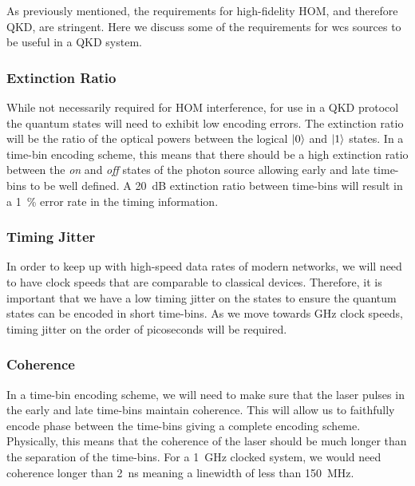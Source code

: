 As previously mentioned, the requirements for high-fidelity \ac{HOM}, and therefore \ac{QKD}, are stringent. Here we discuss some of the requirements for \ac{wcs} sources to be useful in a \ac{QKD} system. 

\subsubsection*{Extinction Ratio}

While not necessarily required for \ac{HOM} interference, for use in a \ac{QKD} protocol the quantum states will need to exhibit low encoding errors. The extinction ratio will be the ratio of the optical powers between the logical $\ket{0}$ and $\ket{1}$ states. In a time-bin encoding scheme, this means that there should be a high extinction ratio between the \textit{on} and \textit{off} states of the photon source allowing early and late time-bins to be well defined. A \SI{20}{dB} extinction ratio between time-bins will result in a \SI{1}{\percent} error rate in the timing information.


\subsubsection*{Timing Jitter}

In order to keep up with high-speed data rates of modern networks, we will need to have clock speeds that are comparable to classical devices. Therefore, it is important that we have a low timing jitter on the states to ensure the quantum states can be encoded in short time-bins. As we move towards GHz clock speeds, timing jitter on the order of picoseconds will be required.

\subsubsection*{Coherence}

In a time-bin encoding scheme, we will need to make sure that the laser pulses in the early and late time-bins maintain coherence. This will allow us to faithfully encode phase between the time-bins giving a complete encoding scheme. Physically, this means that the coherence of the laser should be much longer than the separation of the time-bins. For a \SI{1}{GHz} clocked system, we would need coherence longer than \SI{2}{\ns} meaning a linewidth of less than \SI{150}{MHz}.

